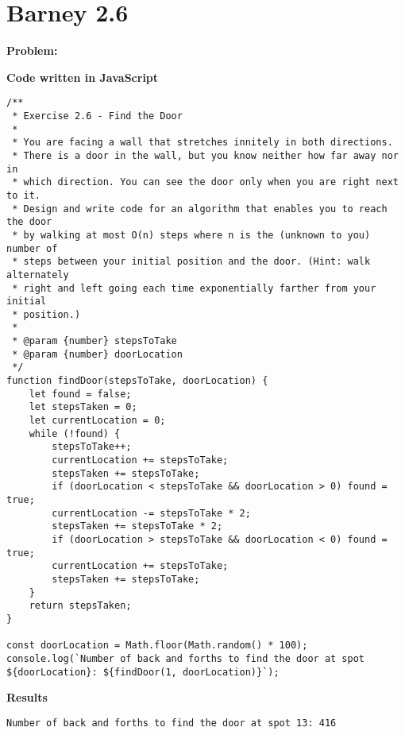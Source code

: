 \documentclass[paper=a4, fontsize=11pt]{scrartcl} %
\numberwithin{equation}{section}
\numberwithin{figure}{section}
\numberwithin{table}{section}
\begin{document}
\section{Barney 2.6}

\textbf{Problem:} 

\bigskip
\textbf{Code written in JavaScript}
\begin{lstlisting}
/**
 * Exercise 2.6 - Find the Door
 * 
 * You are facing a wall that stretches innitely in both directions.
 * There is a door in the wall, but you know neither how far away nor in
 * which direction. You can see the door only when you are right next to it.
 * Design and write code for an algorithm that enables you to reach the door 
 * by walking at most O(n) steps where n is the (unknown to you) number of 
 * steps between your initial position and the door. (Hint: walk alternately 
 * right and left going each time exponentially farther from your initial 
 * position.)
 * 
 * @param {number} stepsToTake 
 * @param {number} doorLocation 
 */
function findDoor(stepsToTake, doorLocation) {
    let found = false;
    let stepsTaken = 0;
    let currentLocation = 0;
    while (!found) {
        stepsToTake++;
        currentLocation += stepsToTake;
        stepsTaken += stepsToTake;
        if (doorLocation < stepsToTake && doorLocation > 0) found = true;
        currentLocation -= stepsToTake * 2;
        stepsTaken += stepsToTake * 2;
        if (doorLocation > stepsToTake && doorLocation < 0) found = true;
        currentLocation += stepsToTake;
        stepsTaken += stepsToTake;
    }
    return stepsTaken;
}

const doorLocation = Math.floor(Math.random() * 100);
console.log(`Number of back and forths to find the door at spot ${doorLocation}: ${findDoor(1, doorLocation)}`);

\end{lstlisting}

\bigskip
\textbf{Results}
\begin{lstlisting}
Number of back and forths to find the door at spot 13: 416
\end{lstlisting}

\pagebreak
\end{document}
